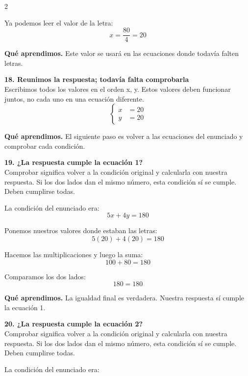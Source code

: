 \documentclass[11pt,a4paper,landscape]{article}
\begin{document}
\begin{multicols*}{2}
\begin{minipage}{\linewidth}
\par\smallskip Ya podemos leer el valor de la letra:
\[x=\frac{80}{4}=20\]
\par\smallskip\textbf{Qué aprendimos.} Este valor se usará en las ecuaciones donde todavía falten letras.
\end{minipage}\par\medskip
\noindent\begin{minipage}{\linewidth}\textbf{18. Reunimos la respuesta; todavía falta comprobarla}\\[2pt]Escribimos todos los valores en el orden x, y. Estos valores deben funcionar juntos, no cada uno en una ecuación diferente.
\[\left\{\begin{aligned}x&=20\\y&=20\end{aligned}\right.\]
\par\smallskip\textbf{Qué aprendimos.} El siguiente paso es volver a las ecuaciones del enunciado y comprobar cada condición.
\end{minipage}\par\medskip
\noindent\begin{minipage}{\linewidth}\textbf{19. ¿La respuesta cumple la ecuación 1?}\\[2pt]Comprobar significa volver a la condición original y calcularla con nuestra respuesta. Si los dos lados dan el mismo número, esta condición sí se cumple. Deben cumplirse todas.
\par\smallskip La condición del enunciado era:
\[5x + 4y = 180\]
\par\smallskip Ponemos nuestros valores donde estaban las letras:
\[5\left(20\right) + 4\left(20\right)=180\]
\par\smallskip Hacemos las multiplicaciones y luego la suma:
\[100 + 80=180\]
\par\smallskip Comparamos los dos lados:
\[180=180\]
\par\smallskip\textbf{Qué aprendimos.} La igualdad final es verdadera. Nuestra respuesta sí cumple la ecuación 1.
\end{minipage}\par\medskip
\noindent\begin{minipage}{\linewidth}\textbf{20. ¿La respuesta cumple la ecuación 2?}\\[2pt]Comprobar significa volver a la condición original y calcularla con nuestra respuesta. Si los dos lados dan el mismo número, esta condición sí se cumple. Deben cumplirse todas.
\par\smallskip La condición del enunciado era:

\end{minipage}
\end{multicols*}
\end{document}
